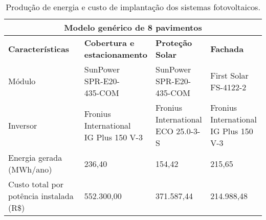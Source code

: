 \begin{table}[H]
    \centering
    \caption{Produção de energia e custo de implantação dos sistemas fotovoltaicos.}
    \begin{tabular}{llll}
        \hline
        \multicolumn{4}{c}{\textbf{Modelo genérico de 8 pavimentos}}                                                                                                                                                                                                                \\ 
        \hline
        \textbf{Características}                                                        & \makecell[l]{\textbf{Cobertura e}\\ \textbf{estacionamento}}      & \makecell[l]{\textbf{Proteção}\\ \textbf{Solar}}          & \textbf{Fachada}                                          \\ 
        \hline
        Módulo                                                                          & \makecell[l]{SunPower \\SPR-E20-\\435-COM}                        & \makecell[l]{SunPower \\SPR-E20-\\435-COM}                & \makecell[l]{First Solar \\FS-4122-2}                     \\
        Inversor                                                                        & \makecell[l]{Fronius \\International \\IG Plus 150 V-3}           & \makecell[l]{Fronius \\International \\ECO 25.0-3-S}      & \makecell[l]{Fronius \\International \\IG Plus 150 V-3}   \\
        \makecell[l]{Energia gerada\\ (MWh/ano)}                                        & 236,40                                                            & 154,42                                                    & 215,65                                                    \\ 
        \hline
        \makecell[l]{Custo total por \\potência instalada (R\$)}                        & 552.300,00                                                        & 371.587,44                                                & 214.988,48                                                \\ 

\end{tabular}
\end{table}
